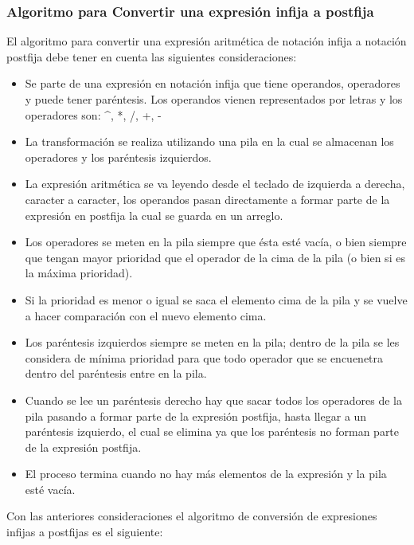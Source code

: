 \subsubsection{Algoritmo para Convertir una expresión infija a postfija }
El algoritmo para convertir una expresión aritmética de notación infija a notación postfija debe tener en cuenta las siguientes consideraciones:

\begin{itemize}
	\item Se parte de una expresión en notación infija que tiene operandos, operadores y puede tener paréntesis. Los operandos vienen representados por letras y los operadores son: \textasciicircum, *, /, +, -
	\item La transformación se realiza utilizando una pila en la cual se almacenan los operadores y los paréntesis izquierdos.
	\item La expresión aritmética se va leyendo desde el teclado de izquierda a derecha, caracter a caracter, los operandos pasan directamente a formar parte de la expresión en postfija la cual se guarda en un arreglo.
	\item Los operadores se meten en la pila siempre que ésta esté vacía, o bien siempre que tengan mayor prioridad que el operador de la cima de la pila (o bien si es la máxima prioridad).
	\item Si la prioridad es menor o igual se saca el elemento cima de la pila y se vuelve a hacer comparación con el nuevo elemento cima.
	\item Los paréntesis izquierdos siempre se meten en la pila; dentro de la pila se les considera de mínima prioridad para que todo operador que se encuenetra dentro del paréntesis entre en la pila.
	\item Cuando se lee un paréntesis derecho hay que sacar todos los operadores de la pila pasando a formar parte de la expresión postfija, hasta llegar a un paréntesis izquierdo, el cual se elimina ya que los paréntesis no forman parte de la expresión postfija.
	\item El proceso termina cuando no hay más elementos de la expresión y la pila esté vacía.
\end{itemize}

Con las anteriores consideraciones el algoritmo de conversión de expresiones infijas a postfijas es el siguiente:

